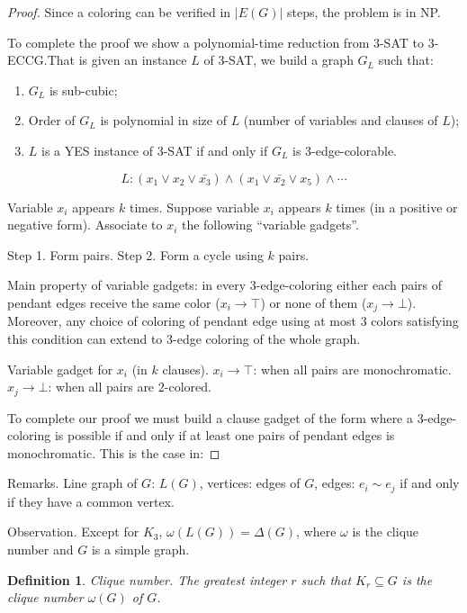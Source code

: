 \documentclass[12pt,a4paper]{article}
\newtheorem{definition}{Definition}
\begin{document}
\begin{proof}
  Since a coloring can be verified in \(|E(G)|\) steps, the problem is in NP.\@

  To complete the proof we show a polynomial-time reduction from \(3\)-SAT to
  \(3\)-ECCG.\@ That is given an instance \(L\) of \(3\)-SAT, we build a graph
  \(G_L\) such that:

  \begin{enumerate}
  \item \(G_L\) is sub-cubic;
  \item Order of \(G_L\) is polynomial in size of \(L\) (number of variables and
    clauses of \(L\));
  \item \(L\) is a YES instance of \(3\)-SAT if and only if \(G_L\) is
    \(3\)-edge-colorable.
  \end{enumerate}

  \[L: (x_1 \vee x_2 \vee \bar{x_3}) \wedge (x_1 \vee \bar{x_2} \vee x_5)
    \wedge \cdots\]

  Variable \(x_i\) appears \(k\) times. Suppose variable \(x_i\) appears \(k\)
  times (in a positive or negative form).  Associate to \(x_i\) the following
  \enquote{variable gadgets}.

  Step 1. Form pairs.
  Step 2. Form a cycle using \(k\) pairs.


  Main property of variable gadgets: in every \(3\)-edge-coloring either each
  pairs of pendant edges receive the same color (\(x_i \to \top\)) or none of
  them (\(x_j \to \bot\)).  Moreover, any choice of coloring of pendant edge
  using at most \(3\) colors satisfying this condition can extend to \(3\)-edge
  coloring of the whole graph.

  Variable gadget for \(x_i\) (in \(k\) clauses).
  \(x_i \to \top\): when all pairs are monochromatic.
  \(x_j \to \bot\): when all pairs are \(2\)-colored.

  To complete our proof we must build a clause gadget of the form where a
  \(3\)-edge-coloring is possible if and only if at least one pairs of pendant
  edges is monochromatic. This is the case in:
\end{proof}

Remarks.  Line graph of \(G\): \(L(G)\), vertices: edges of \(G\), edges:
\(e_i \sim e_j\) if and only if they have a common vertex.

Observation.  Except for \(K_3\), \(\omega(L(G)) = \Delta(G)\), where \(\omega\)
is the clique number and \(G\) is a simple graph.

\begin{definition}
  Clique number.  The greatest integer \(r\) such that \(K_r \subseteq G\) is
  the clique number \(\omega(G)\) of \(G\).
\end{definition}
\end{document}
